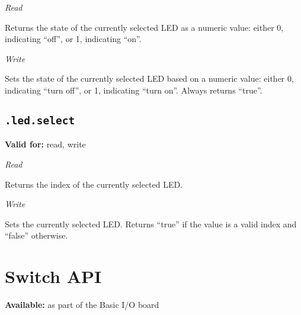 \documentclass{article}
\begin{document}
\textit{Read}

Returns the state of the currently selected LED as a numeric value: either 0, indicating ``off'', or 1, indicating ``on''.

\textit{Write}

Sets the state of the currently selected LED based on a numeric value: either 0, indicating ``turn off'', or 1, indicating ``turn on''. Always returns ``true''.

\subsection{\texttt{.led.select}}
\textbf{Valid for:} read, write

\textit{Read}

Returns the index of the currently selected LED.

\textit{Write}

Sets the currently selected LED. Returns ``true'' if the value is a valid index and ``false'' otherwise.

%
%
%
%
%
%
%
%
%
%
%
\section{Switch API}
\textbf{Available:} as part of the Basic I/O board
\end{document}
